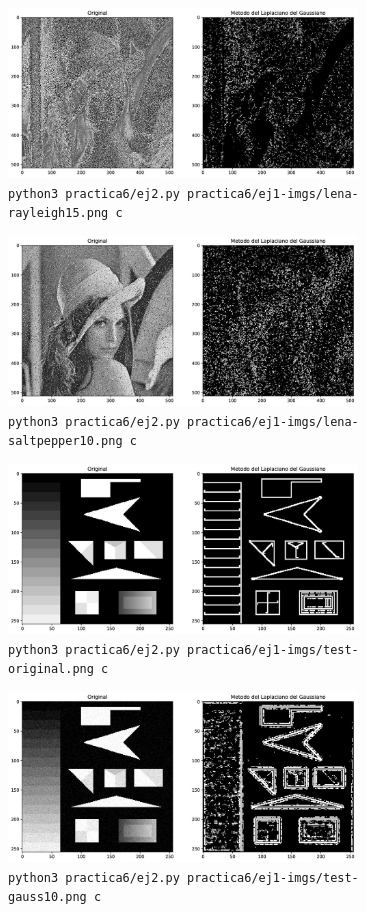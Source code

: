 \documentclass[11pt, spanish]{article}
\begin{document}
\begin{figure}[H]
\centering
    \includegraphics[height=4.5cm]{informe-imgs/ej2-c-lena-rayleigh15.jpg}
    \caption{\texttt{python3 practica6/ej2.py practica6/ej1-imgs/lena-rayleigh15.png c}}
\end{figure}

\begin{figure}[H]
\centering
    \includegraphics[height=4.5cm]{informe-imgs/ej2-c-lena-saltpepper10.jpg}
    \caption{\texttt{python3 practica6/ej2.py practica6/ej1-imgs/lena-saltpepper10.png c}}
\end{figure}


\begin{figure}[H]
\centering
    \includegraphics[height=4.5cm]{informe-imgs/ej2-c-test-original.jpg}
    \caption{\texttt{python3 practica6/ej2.py practica6/ej1-imgs/test-original.png c}}
\end{figure}

\begin{figure}[H]
\centering
    \includegraphics[height=4.5cm]{informe-imgs/ej2-c-test-gauss10.jpg}
    \caption{\texttt{python3 practica6/ej2.py practica6/ej1-imgs/test-gauss10.png c}}
\end{figure}
\end{document}
